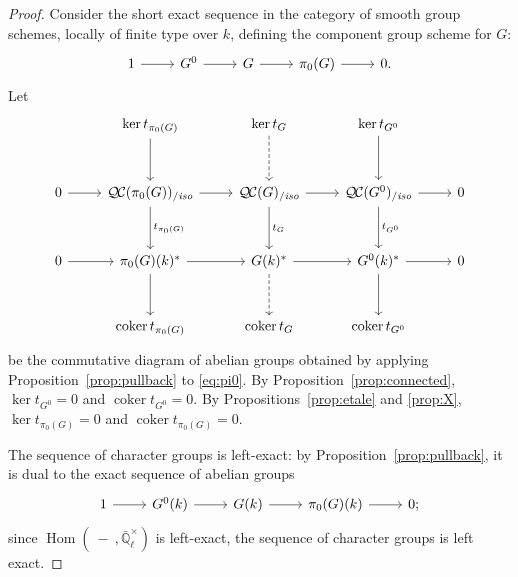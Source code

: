 \documentclass[11pt]{amsart}
\theoremstyle{plain}
\theoremstyle{definition}
\theoremstyle{remark}
\newcommand{\EE}{\mathbb{\bar Q}_\ell}
\newcommand{\Fq}{k}
\newcommand{\EEx}{\EE^\times}
\DeclareMathOperator{\Hom}{Hom}
\DeclareMathOperator{\coker}{coker}
\newcommand{\QC}{{\mathcal{Q\hskip-0.8pt C}}}
\newcommand{\QCiso}[1]{\QC(#1)_{/\textit{iso}}}
\newcommand{\trFrob}[1]{t_{#1}}
\begin{document}
\begin{proof}
  Consider the short exact sequence in the category of smooth group
  schemes, locally of finite type over $\Fq$, defining the component
  group scheme for $G$:
  \begin{equation}\label{eq:pi0}
  \begin{tikzcd}
    1 \rar & G^0 \rar & G \rar & \pi_0(G) \rar & 0.
  \end{tikzcd}
  \end{equation}
  Let
  \[
  \begin{tikzcd}[row sep=30]
    {}& \ker \trFrob{\pi_0(G)} \dar & \arrow[dashed]{d} \ker \trFrob{G} & \ker \trFrob{G^0} \dar & \\
    0 \rar & \QCiso{\pi_0(G)} \rar \dar{\trFrob{\pi_0(G)}}
    & \QCiso{G} \rar \dar{\trFrob{G}} & \QCiso{G^0} \rar \dar{\trFrob{G^0}} & 0\\
    0 \rar & \pi_0(G)(\Fq)^* \rar \dar
    & \arrow[dashed]{d} G(\Fq)^* \rar & G^0(\Fq)^* \rar \dar & 0\\
    & \coker \trFrob{\pi_0(G)} & \coker \trFrob{G} &  \coker \trFrob{G^0} &
  \end{tikzcd}
  \]
  be the commutative diagram of abelian groups obtained by applying
  Proposition~\ref{prop:pullback} to \eqref{eq:pi0}.  By
  Proposition~\ref{prop:connected}, $\ker \trFrob{G^0} =0$ and $\coker \trFrob{G^0}=0$.
  By Propositions~\ref{prop:etale} and \ref{prop:X}, $\ker \trFrob{\pi_0(G)}=0$
  and $\coker \trFrob{\pi_0(G)}=0$.

  The sequence of character groups is left-exact: by
  Proposition~\ref{prop:pullback}, it is dual to the exact sequence of
  abelian groups
  \begin{equation}\label{eq:pi1}
  \begin{tikzcd}
    1 \rar & G^0(\Fq) \rar & G(\Fq) \rar & \pi_0(G)(\Fq) \rar & 0;
  \end{tikzcd}
  \end{equation}
  since $\Hom(\ - \ ,\EEx)$ is left-exact, the sequence of
  character groups is left exact.


\end{proof}
\end{document}
